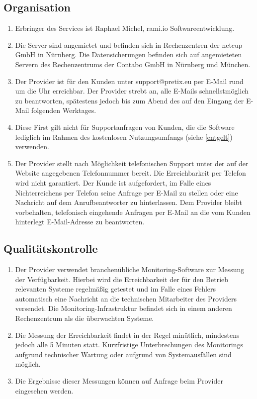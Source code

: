 \documentclass{terms}
\begin{document}
\subsection{Organisation}
\begin{enumerate}
\item Erbringer des Services ist Raphael Michel, rami.io Softwareentwicklung.
\item Die Server sind angemietet und befinden sich in Rechenzentren der netcup GmbH in Nürnberg. Die Datensicherungen befinden sich auf angemieteten Servern des Rechenzentrums der Contabo GmbH in Nürnberg und München.
\item Der Provider ist für den Kunden unter support@pretix.eu per E-Mail rund um die Uhr erreichbar. Der Provider strebt an, alle E-Mails schnellstmöglich zu beantworten, spätestens jedoch bis zum Abend des auf den Eingang der E-Mail folgenden Werktages.
\item Diese First gilt nicht für Supportanfragen von Kunden, die die Software lediglich im Rahmen des kostenlosen Nutzungsumfangs (siehe \ref{entgelt}) verwenden.
\item Der Provider stellt nach Möglichkeit telefonischen Support unter der auf der Website angegebenen Telefonnummer bereit. Die Erreichbarkeit per Telefon wird nicht garantiert. Der Kunde ist aufgefordert, im Falle eines Nichterreichens per Telefon seine Anfrage per E-Mail zu stellen oder eine Nachricht auf dem Anrufbeantworter zu hinterlassen. Dem Provider bleibt vorbehalten, telefonisch eingehende Anfragen per E-Mail an die vom Kunden hinterlegt E-Mail-Adresse zu beantworten.
\end{enumerate}

\subsection{Qualitätskontrolle}
\begin{enumerate}
\item Der Provider verwendet branchenübliche Monitoring-Software zur Messung der Verfügbarkeit. Hierbei wird die Erreichbarkeit der für den Betrieb relevanten Systeme regelmäßig getestet und im Falle eines Fehlers automatisch eine Nachricht an die technischen Mitarbeiter des Providers versendet. Die Monitoring-Infrastruktur befindet sich in einem anderen Rechenzentrum als die überwachten Systeme.
\item Die Messung der Erreichbarkeit findet in der Regel minütlich, mindestens jedoch alle 5 Minuten statt. Kurzfristige Unterbrechungen des Monitorings aufgrund technischer Wartung oder aufgrund von Systemausfällen sind möglich.
\item Die Ergebnisse dieser Messungen können auf Anfrage beim Provider eingesehen werden.
\end{enumerate}
\end{document}
